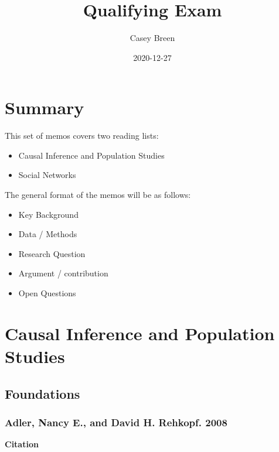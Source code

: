\documentclass[
]{book}
\title{Qualifying Exam}
\author{Casey Breen}
\date{2020-12-27}
\providecommand{\tightlist}{%
  \setlength{\itemsep}{0pt}\setlength{\parskip}{0pt}}
\begin{document}
\maketitle

{
\setcounter{tocdepth}{1}
\tableofcontents
}
\hypertarget{summary}{%
\chapter{Summary}\label{summary}}

This set of memos covers two reading lists:

\begin{itemize}
\tightlist
\item
  Causal Inference and Population Studies
\item
  Social Networks
\end{itemize}

The general format of the memos will be as follows:

\begin{itemize}
\item
  Key Background
\item
  Data / Methods
\item
  Research Question
\item
  Argument / contribution
\item
  Open Questions
\end{itemize}

\hypertarget{causal-inference-and-population-studies}{%
\chapter{Causal Inference and Population Studies}\label{causal-inference-and-population-studies}}

\hypertarget{foundations}{%
\section{Foundations}\label{foundations}}

\hypertarget{adler-nancy-e.-and-david-h.-rehkopf.-2008}{%
\subsection*{Adler, Nancy E., and David H. Rehkopf. 2008}\label{adler-nancy-e.-and-david-h.-rehkopf.-2008}}

\textbf{Citation}
\end{document}

